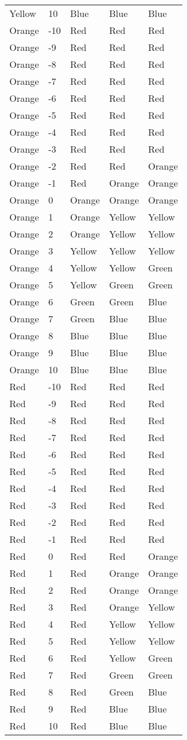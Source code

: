 \documentclass[
]{article}
\begin{document}
\begin{longtable}[]{@{}lllll@{}}
Yellow & 10 & Blue & Blue & Blue \\
Orange & -10 & Red & Red & Red \\
Orange & -9 & Red & Red & Red \\
Orange & -8 & Red & Red & Red \\
Orange & -7 & Red & Red & Red \\
Orange & -6 & Red & Red & Red \\
Orange & -5 & Red & Red & Red \\
Orange & -4 & Red & Red & Red \\
Orange & -3 & Red & Red & Red \\
Orange & -2 & Red & Red & Orange \\
Orange & -1 & Red & Orange & Orange \\
Orange & 0 & Orange & Orange & Orange \\
Orange & 1 & Orange & Yellow & Yellow \\
Orange & 2 & Orange & Yellow & Yellow \\
Orange & 3 & Yellow & Yellow & Yellow \\
Orange & 4 & Yellow & Yellow & Green \\
Orange & 5 & Yellow & Green & Green \\
Orange & 6 & Green & Green & Blue \\
Orange & 7 & Green & Blue & Blue \\
Orange & 8 & Blue & Blue & Blue \\
Orange & 9 & Blue & Blue & Blue \\
Orange & 10 & Blue & Blue & Blue \\
Red & -10 & Red & Red & Red \\
Red & -9 & Red & Red & Red \\
Red & -8 & Red & Red & Red \\
Red & -7 & Red & Red & Red \\
Red & -6 & Red & Red & Red \\
Red & -5 & Red & Red & Red \\
Red & -4 & Red & Red & Red \\
Red & -3 & Red & Red & Red \\
Red & -2 & Red & Red & Red \\
Red & -1 & Red & Red & Red \\
Red & 0 & Red & Red & Orange \\
Red & 1 & Red & Orange & Orange \\
Red & 2 & Red & Orange & Orange \\
Red & 3 & Red & Orange & Yellow \\
Red & 4 & Red & Yellow & Yellow \\
Red & 5 & Red & Yellow & Yellow \\
Red & 6 & Red & Yellow & Green \\
Red & 7 & Red & Green & Green \\
Red & 8 & Red & Green & Blue \\
Red & 9 & Red & Blue & Blue \\
Red & 10 & Red & Blue & Blue \\
\end{longtable}
\end{document}
